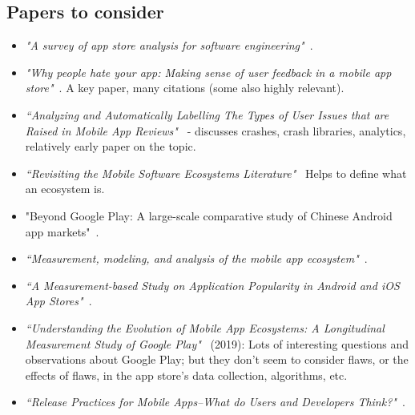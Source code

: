\subsection{Papers to consider}
\begin{itemize}
    \item \emph{"A survey of app store analysis for software engineering"}~\cite{martin2016survey}.
    
    \item \emph{"Why people hate your app: Making sense of user feedback in a mobile app store"}~\cite{fu2013people}. A key paper, many citations (some also highly relevant).
    
    \item \emph{``Analyzing and Automatically Labelling The Types of User Issues that are Raised in Mobile App Reviews"}~\cite{mcilroy2016analyzing} - discusses crashes, crash libraries, analytics, relatively early paper on the topic.
    
    \item \emph{``Revisiting the Mobile Software Ecosystems Literature"}~\cite{steglich2019revisiting} Helps to define what an ecosystem is.
    
    \item "Beyond Google Play: A large-scale comparative study of Chinese Android app markets"~\cite{wang2018beyond}.
    
    \item \emph{``Measurement, modeling, and analysis of the mobile app ecosystem"}~\cite{petsas2017measurement}.
    
    \item \emph{``A Measurement-based Study on Application Popularity in Android and iOS App Stores"}~\cite{liu2015measurement}.
    
    \item \emph{``Understanding the Evolution of Mobile App Ecosystems: A Longitudinal Measurement Study of Google Play"}~\cite{wang2019understanding} (2019): Lots of interesting questions and observations about Google Play; but they don't seem to consider flaws, or the effects of flaws, in the app store's data collection, algorithms, etc.
    
    \item \emph{``Release Practices for Mobile Apps--What do Users and Developers Think?"}~\cite{nayebi2016release}.
    

\end{itemize}
